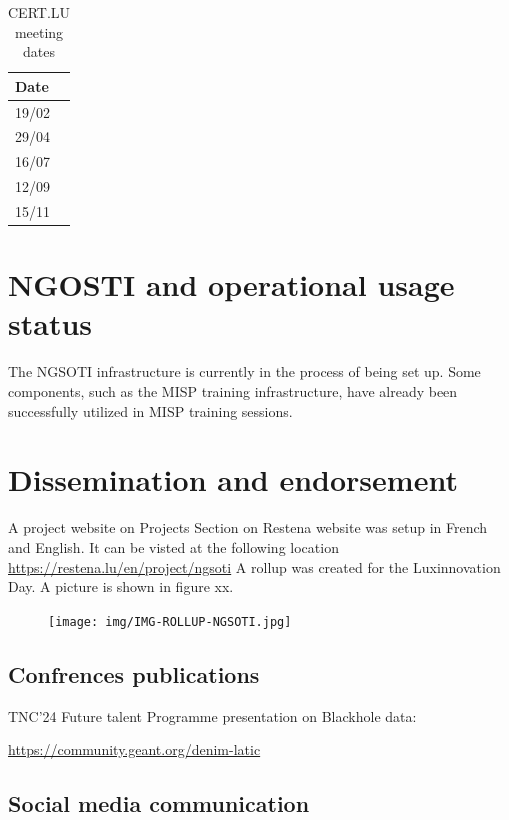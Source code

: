 \begin{table}[H]
    \centering
    \begin{tabular}{l}
    Date\\
    \hline
    19/02\\
    29/04\\
    16/07\\
    12/09\\
    15/11\\
    \end{tabular}
    \caption{CERT.LU meeting dates}
    \label{certlu}
\end{table}

\chapter{NGOSTI and operational usage status}

The NGSOTI infrastructure is currently in the process of being set up. Some components, such as the MISP training infrastructure, have already been successfully utilized in MISP training sessions.

\chapter{Dissemination and endorsement}

A project website on Projects Section on Restena website was setup in French and English.
It can be visted at the following location \url{  https://restena.lu/en/project/ngsoti}
A rollup was created for the Luxinnovation Day. A picture is shown in figure xx.

\begin{figure}
    \texttt{[image: img/IMG-ROLLUP-NGSOTI.jpg]}
\end{figure}

\section{Confrences publications}

TNC'24 Future talent Programme presentation on Blackhole data:

  \url{https://community.geant.org/denim-latic}



\section{ Social media communication}

